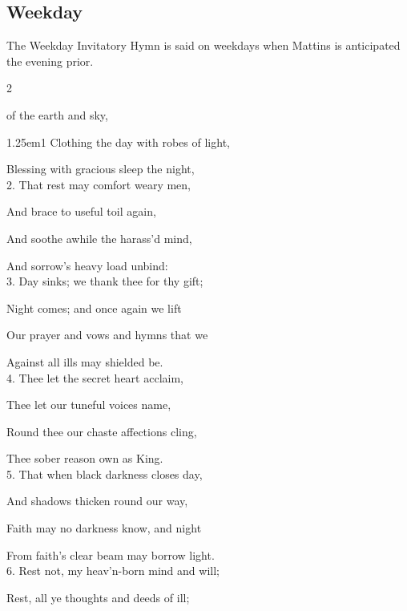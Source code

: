 \subsection{Weekday}\label{WeekdayInvitatory}
\begin{rubric}
	The Weekday Invitatory Hymn is said on weekdays when Mattins is anticipated the evening prior.
\end{rubric}

\begin{multicols}{2}
\sloppy

 of the earth and sky,


\begin{hangparas}{1.25em}{1}
Clothing the day with robes of light,

Blessing with gracious sleep the night,\\

2. That rest may comfort weary men,

And brace to useful toil again,

And soothe awhile the harass'd mind,

And sorrow’s heavy load unbind:\\

3. Day sinks; we thank thee for thy gift;

Night comes; and once again we lift

Our prayer and vows and hymns that we

Against all ills may shielded be.\\

4. Thee let the secret heart acclaim,

Thee let our tuneful voices name,

Round thee our chaste affections cling,

Thee sober reason own as King.\\

5. That when black darkness closes day,

And shadows thicken round our way,

Faith may no darkness know, and night

From faith’s clear beam may borrow light.\\

6. Rest not, my heav'n-born mind and will;

Rest, all ye thoughts and deeds of ill;


\end{hangparas}
\end{multicols}
